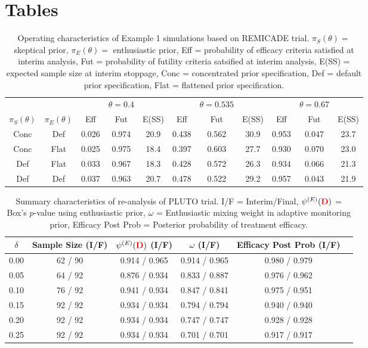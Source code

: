 \documentclass[12pt]{article}
\begin{document}
\newpage
\section*{Tables}

\begin{table}[htbp]\label{tbl:real-pluto}%
\centering
\caption{Operating characteristics of Example 1 simulations based on REMICADE trial. $\pi_S(\theta)=$ skeptical prior, $\pi_E(\theta)=$ enthusiastic prior, Eff = probability of efficacy criteria satisfied at interim analysis, Fut = probability of futility criteria satsified at interim analysis, E(SS) = expected sample size at interim stoppage, Conc = concentrated prior specification, Def = default prior specification, Flat = flattened prior specification. }%
\begin{tabular*}{500pt}{@{\extracolsep\fill}ccccccccccc@{\extracolsep\fill}}%
\toprule
	&		&	&		$\theta=0.4$&			&		&	$\theta=0.535$	&		&	&		$\theta=0.67$&		\\
	\cline{3-5} \cline{6-8} \cline{9-11}
$\pi_S(\theta)$	&	$\pi_E(\theta)$	&	Eff  &	Fut 	&	E(SS) &	Eff  &	Fut 	&	E(SS) 	&	Eff  &	Fut 	&	E(SS) 	\\
\midrule
Conc	&	Def	&	0.026	&	0.974	&	20.9 	&	0.438	&	0.562	&	30.9	&	0.953	&	0.047	&	23.7	\\
Conc	&	Flat	&	0.025	&	0.975	&	18.4 	&	0.397	&	0.603	&	27.7	&	0.930	&	0.070	&	23.0	\\
Def	&	Flat	&	0.033	&	0.967	&	18.3	&	0.428	&	0.572	&	26.3	&	0.934	&	0.066	&	21.3 	\\
Def	&	Def	&	0.037	&	0.963	&	20.7	&	0.478	&	0.522	&	29.2 	&	0.957	&	0.043	&	21.9	\\
\bottomrule
\end{tabular*}
\end{table}

\newpage
\begin{table}[htbp]\label{tbl:real-pluto}%
\centering
\caption{Summary characteristics of re-analysis of PLUTO trial. I/F = Interim/Final, $\psi^{(E)}(\textcolor{red}{\mathbf{D}})$ = Box's $p$-value using enthusiastic prior, $\omega$ = Enthusiastic mixing weight in adaptive monitoring prior, Efficacy Post Prob = Posterior probability of treatment efficacy.}%
\begin{tabular*}{450pt}{@{\extracolsep\fill}cccccc@{\extracolsep\fill}}%
\toprule
$\delta$	&	Sample Size (I/F)			&	$\psi^{(E)}(\textcolor{red}{\mathbf{D}})$ (I/F)			&	$\omega$ (I/F)			&	Efficacy Post Prob (I/F)			\\
\midrule
0.00	&	62	/	90	&	0.914	/	0.965	&	0.914	/	0.965	&	0.980	/	0.979	\\
0.05	&	64	/	92	&	0.876	/	0.934	&	0.833	/	0.887	&	0.976	/	0.962	\\
0.10	&	76	/	92	&	0.941	/	0.934	&	0.847	/	0.841	&	0.975	/	0.951	\\
0.15	&	92	/	92	&	0.934	/	0.934	&	0.794	/	0.794	&	0.940	/	0.940	\\
0.20	&	92	/	92	&	0.934	/	0.934	&	0.747	/	0.747	&	0.928	/	0.928	\\
0.25	&	92	/	92	&	0.934	/	0.934	&	0.701	/	0.701	&	0.917	/	0.917	\\
\bottomrule
\end{tabular*}
\end{table}
\end{document}
